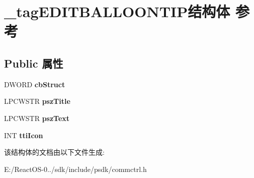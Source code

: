 \hypertarget{struct__tag_e_d_i_t_b_a_l_l_o_o_n_t_i_p}{}\section{\+\_\+tag\+E\+D\+I\+T\+B\+A\+L\+L\+O\+O\+N\+T\+I\+P结构体 参考}
\label{struct__tag_e_d_i_t_b_a_l_l_o_o_n_t_i_p}
\subsection*{Public 属性}
\begin{DoxyCompactItemize}
\item 
\mbox{\label{struct__tag_e_d_i_t_b_a_l_l_o_o_n_t_i_p_a47887d0a95d85d28eb349dbb6bd878d5}} 
D\+W\+O\+RD {\bfseries cb\+Struct}
\item 
\mbox{\label{struct__tag_e_d_i_t_b_a_l_l_o_o_n_t_i_p_aec108e020bc21ffb73c8e84be89c808b}} 
L\+P\+C\+W\+S\+TR {\bfseries psz\+Title}
\item 
\mbox{\label{struct__tag_e_d_i_t_b_a_l_l_o_o_n_t_i_p_a841dd36e8edfaf7c7369c64ee31ccf9b}} 
L\+P\+C\+W\+S\+TR {\bfseries psz\+Text}
\item 
\mbox{\label{struct__tag_e_d_i_t_b_a_l_l_o_o_n_t_i_p_a0731c36d7d824b8ec4a568081af2665b}} 
I\+NT {\bfseries tti\+Icon}
\end{DoxyCompactItemize}


该结构体的文档由以下文件生成\+:\begin{DoxyCompactItemize}
\item 
E\+:/\+React\+O\+S-\/0../sdk/include/psdk/commctrl.\+h\end{DoxyCompactItemize}
